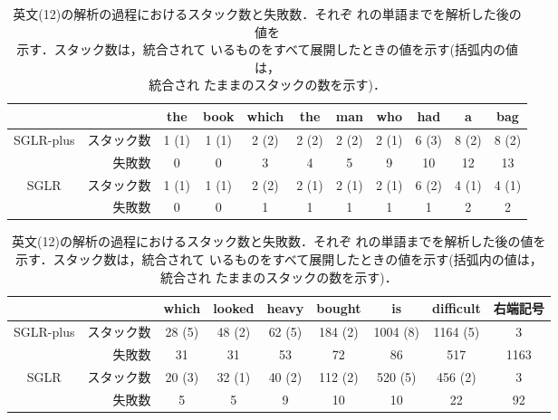{\footnotesize
  \begin{table}[htbp]
    \begin{center}
      \caption{英文(12)の解析の過程におけるスタック数と失敗数．それぞ
        れの単語までを解析した後の値を\\示す．スタック数は，統合されて
        いるものをすべて展開したときの値を示す(括弧内の値は，\\統合され
        たままのスタックの数を示す)．}
      \label{tab:3}
      \begin{minipage}[h]{\textwidth}
        \begin{tabular}[h]{|cr||c|c|c|c|c|c|c|c|c|} \hline
                   &            & the   & book  & which  & the    & man   & who   & had   & a     & bag   \\ \hline\hline
         SGLR-plus & スタック数 & 1 (1) & 1 (1) & 2 (2)  & 2 (2)  & 2 (2) & 2 (1) & 6 (3) & 8 (2) & 8 (2) \\
                   & 失敗数     & 0     & 0     & 3      & 4      & 5     & 9     & 10    & 12    & 13    \\ \hline
         SGLR      & スタック数 & 1 (1) & 1 (1) & 2 (2)  & 2 (1)  & 2 (1) & 2 (1) & 6 (2) & 4 (1) & 4 (1) \\
                   & 失敗数     & 0     & 0     & 1      & 1      & 1     & 1     & 1     & 2     & 2     \\ \hline
        \end{tabular}
      \end{minipage}

      \vspace{2mm}
      \begin{minipage}[h]{\textwidth}
        \begin{tabular}[h]{|cr||c|c|c|c|c|c|c|} \hline
                   &            & which  & looked & heavy  & bought  & is       & difficult & 右端記号 \\ \hline\hline
         SGLR-plus & スタック数 & 28 (5) & 48 (2) & 62 (5) & 184 (2) & 1004 (8) & 1164 (5)  & 3    \\
                   & 失敗数     & 31     & 31     & 53     & 72      & 86       & 517       & 1163 \\ \hline
         SGLR      & スタック数 & 20 (3) & 32 (1) & 40 (2) & 112 (2) & 520 (5)  & 456 (2)   & 3    \\
                   & 失敗数     & 5      & 5      & 9      & 10      & 10       & 22        & 92   \\ \hline
        \end{tabular}
      \end{minipage}
    \end{center}
  \end{table}
  }


